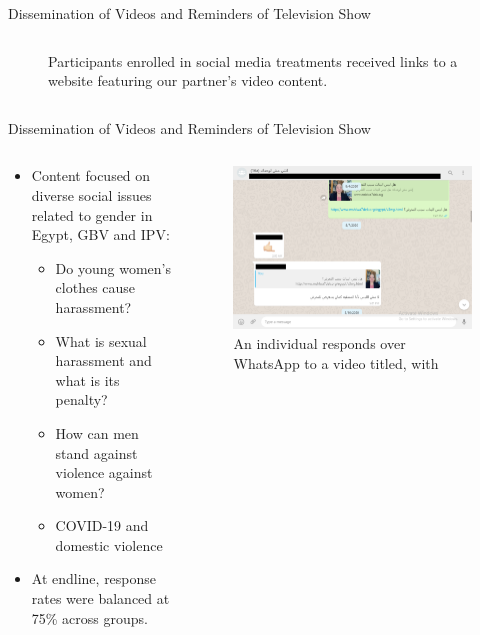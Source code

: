 \documentclass[10pt]{beamer}
\begin{document}
\begin{frame}{Dissemination of Videos and Reminders of Television Show}
\begin{columns}[T]
\begin{column}{0.5\textwidth}
\begin{figure}
\caption{Participants enrolled in social media treatments received links to a website featuring our partner's video content.} 
\end{figure} 
\end{column}
\end{columns}
\end{frame}

\begin{frame}{Dissemination of Videos and Reminders of Television Show}
\begin{columns}[T] \begin{column}{0.55\textwidth}
\begin{itemize}
     \item Content focused on diverse social issues related to gender in Egypt, GBV and IPV:
    \begin{itemize}
        \item Do young women's clothes cause harassment?
        \item What is sexual harassment and what is its penalty?
        \item How can men stand against violence against women?
        \item COVID-19 and domestic violence
    \end{itemize}
     \item At endline, response rates were balanced at 75\% across groups. 
\end{itemize}
\end{column}
\begin{column}{0.5\textwidth}
\begin{figure} \includegraphics[width = 1\textwidth]{Recruit_Intervention/30.png}\captionsetup{font=small}
\caption{An individual responds over WhatsApp to a video titled,  with } 
 \end{figure} 
\end{column}
\end{columns}
\end{frame}
\end{document}
